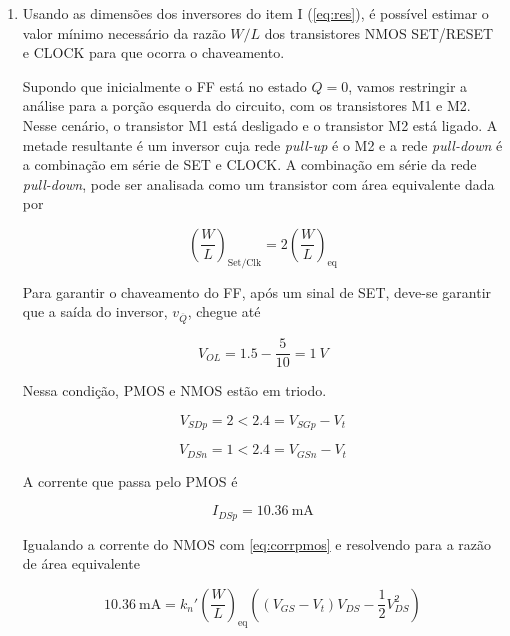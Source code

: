 \documentclass[11pt]{article}
\begin{document}
\begin{enumerate}[label=\alph*)]

\item Usando as dimensões dos inversores do item I (\ref{eq:res}), é possível estimar o valor mínimo necessário da razão $W/L$ dos transistores NMOS SET/RESET e CLOCK para que ocorra o chaveamento.

Supondo que inicialmente o FF está no estado $Q=0$, vamos restringir a análise para a porção esquerda do circuito, com os transistores M1 e M2. Nesse cenário, o transistor M1 está desligado e o transistor M2 está ligado. A metade resultante é um inversor cuja rede \textit{pull-up} é o M2 e a rede \textit{pull-down} é a combinação em série de SET e CLOCK. A combinação em série da rede \textit{pull-down}, pode ser analisada como um transistor com área equivalente dada por

\begin{equation}
    \left(\frac{W}{L}\right)_\text{Set/Clk} = 2\left(\frac{W}{L}\right)_\text{eq}
\end{equation}

Para garantir o chaveamento do FF, após um sinal de SET, deve-se garantir que a saída do inversor, $v_{\overline{Q}}$, chegue até

\begin{equation}
    V_{OL} = 1.5 - \frac{5}{10} = 1\ V
\end{equation}

Nessa condição, PMOS e NMOS estão em triodo.

\begin{equation}
    V_{SDp} = 2 < 2.4 = V_{SGp} - V_t
\end{equation}

\begin{equation}
    V_{DSn} = 1 < 2.4 = V_{GSn} - V_t
\end{equation}

A corrente que passa pelo PMOS é

\begin{equation}\label{eq:corrpmos}
    I_{DSp} = 10.36\ \text{mA}
\end{equation}

Igualando a corrente do NMOS com \ref{eq:corrpmos} e resolvendo para a razão de área equivalente

\begin{equation}
    10.36\ \text{mA} = k_n'\left(\frac{W}{L}\right)_\text{eq}\left((V_{GS} - V_t)V_{DS} - \frac{1}{2}V_{DS}^2\right)
\end{equation}


\end{enumerate}
\end{document}
